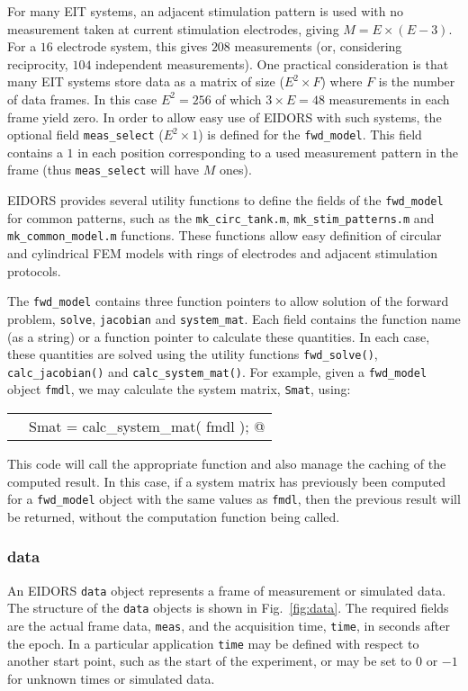 \documentclass[12pt]{iopart}
\makeatletter
\newcommand{\CODEstart}{\medskip\begin{tabular}{ll}}
\newcommand{\CN}{\tt\scriptsize} %
\newcommand{\CC}{&\small\verb@}   % start code
\newcommand{\CODEend}{\end{tabular}\medskip}
\makeatother
\begin{document}
For many EIT systems, an adjacent stimulation
pattern is used with no measurement taken at current
stimulation electrodes, giving $M = E\times(E-3)$.
For a $16$ electrode system, this gives $208$
measurements (or, considering reciprocity, $104$ independent
measurements). One practical consideration is that
many EIT systems store data as a matrix of size
($E^2{\times}F$) where $F$ is the number of data
frames. In this case $E^2= 256$ of which $3{\times}E = 48$ measurements
in each frame yield zero. In order to allow easy 
use of EIDORS with such systems, the optional
field {\tt meas\_select} ($E^2\times1$) is defined
for the {\tt fwd\_model}. This field contains a 
$1$ in each position corresponding to a used measurement
pattern in the frame (thus {\tt meas\_select} will
have $M$ ones).

EIDORS provides several utility functions to define
the fields of the {\tt fwd\_model} for common 
patterns, such as the
{\tt mk\_circ\_tank.m},
{\tt mk\_stim\_patterns.m} and
{\tt mk\_common\_model.m} functions. These functions
allow easy definition of circular and cylindrical
FEM models with rings of electrodes and adjacent
stimulation protocols.

The {\tt fwd\_model} contains three function pointers
to allow solution of the forward problem,
{\tt solve},
{\tt jacobian} and
{\tt system\_mat}. Each field contains the function
name (as a string) or a function pointer to calculate
these quantities. In each case, these quantities
are solved using the utility functions 
{\tt fwd\_solve()}, 
{\tt calc\_jacobian()} and
{\tt calc\_system\_mat()}.
For example, given
a {\tt fwd\_model} object {\tt fmdl}, we may calculate
the system matrix, {\tt Smat}, using:

\CODEstart
\CN    \CC Smat = calc_system_mat( fmdl ); @\\[-3pt]
\CODEend

This code will
call the appropriate function and also manage
the caching of the computed result. In this case, if a
system matrix has previously been computed for
a {\tt fwd\_model} object with the same values
as {\tt fmdl}, then the previous result will be
returned, without the computation function being
called.


\subsubsection{data}

An EIDORS {\tt data} object represents a frame of
measurement or simulated data. The structure of the
{\tt data} objects is shown in Fig.~\ref{fig:data}. The
required fields are the actual frame data, {\tt meas},
and the acquisition time, {\tt time}, in seconds 
after the epoch. In a particular application {\tt time}
may be defined with respect to another start point, such as
the start of the experiment, or may be set to $0$ or $-1$ 
for unknown times or simulated data.
\end{document}
